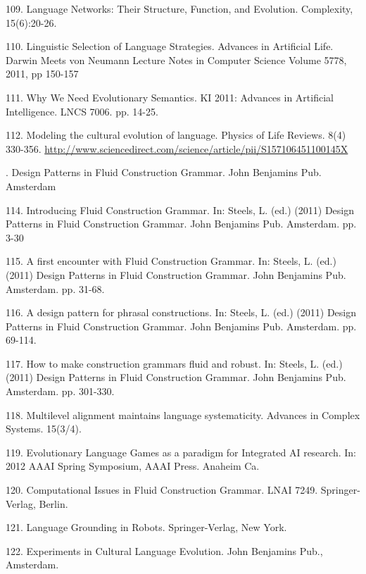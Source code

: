 109. \citet{sole:10f} Language Networks: Their Structure, Function, and Evolution. Complexity, 15(6):20-26. 

110. \citet{Bleys/Steels:11a} Linguistic Selection of Language Strategies. Advances in Artificial Life. Darwin Meets von Neumann Lecture Notes in Computer Science Volume 5778, 2011, pp 150-157

111. \citet{Steels:11b} Why We Need Evolutionary Semantics. KI 2011: Advances in Artificial Intelligence.  LNCS 7006. pp. 14-25. 

112. \citet{Steels:11c} Modeling the cultural evolution of language. Physics of Life Reviews. 8(4) 330-356. \url{http://www.sciencedirect.com/science/article/pii/S157106451100145X}

. \citet{Steels:11d} Design Patterns in Fluid Construction Grammar. John Benjamins Pub. Amsterdam 

114. \citet{Steels:11e} Introducing Fluid Construction Grammar. In: Steels, L. (ed.) (2011) Design Patterns in Fluid Construction Grammar. John Benjamins Pub. Amsterdam. pp. 3-30

115. \citet{Steels:11f} A first encounter with Fluid Construction Grammar. In: Steels, L. (ed.) (2011) Design Patterns in Fluid Construction Grammar. John Benjamins Pub. Amsterdam. pp. 31-68. 

116. \citet{Steels:11g} A design pattern for phrasal constructions. In: Steels, L. (ed.) (2011) Design Patterns in Fluid Construction Grammar. John Benjamins Pub. Amsterdam. pp. 69-114. 

117. \citet{Steels:11h} How to make construction grammars fluid and robust. In: Steels, L. (ed.) (2011) Design Patterns in Fluid Construction Grammar. John Benjamins Pub. Amsterdam. pp. 301-330. 

118. \citet{Vantrijp:12a} Multilevel alignment maintains language systematicity. Advances in Complex Systems. 15(3/4). 

119. \citet{Steels:12b} Evolutionary Language Games as a paradigm for Integrated AI research. In: 2012 AAAI Spring Symposium, AAAI Press. 
Anaheim Ca. 

120. \citet{Steels:12c} Computational Issues in Fluid Construction Grammar. LNAI 7249. Springer-Verlag, Berlin. 

121. \citet{Steels:12d} Language Grounding in Robots. Springer-Verlag, New York. 

122. \citet{Steels:12e} Experiments in Cultural Language Evolution. John Benjamins Pub., Amsterdam. 
 
